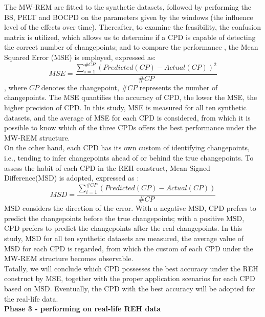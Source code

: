 \documentclass[]{interact}
\theoremstyle{plain}%
\theoremstyle{definition}
\theoremstyle{remark}
\begin{document}
{	The MW-REM are fitted to the synthetic datasets, followed by performing the BS, PELT and BOCPD on the parameters given by the windows (the influence level of the effects over time). Thereafter, to examine the feasibility, the confusion matrix is utilized, which allows us to determine if a CPD is capable of detecting the correct number of changepoints; and to compare the performance \cite{aminikhanghahiSurveyMethodsTime2017}, the Mean Squared Error (MSE) is employed,  expressed as:
	\begin{equation} \label{11}
		MSE = \frac{\sum_{i = 1}^{\#CP} (Predicted(CP) - Actual(CP))^2}{\#CP}
	\end{equation}
	, where $CP$ denotes the changepoint, $\#CP$ represents the number of changepoints. The MSE quantifies the accuracy of CPD, the lower the MSE, the higher precision of CPD. In this study, MSE is measured for all ten synthetic datasets, and the average of MSE for each CPD is considered, from which it is possible to know which of the three CPDs offers the best performance under the MW-REM structure. \\
	
	On the other hand, each CPD has its own custom of identifying changepoints, i.e., tending to infer changepoints ahead of or behind the true changepoints. To assess the habit of each CPD in the REH construct, Mean Signed Difference(MSD) is adopted, expressed as \cite{aminikhanghahiSurveyMethodsTime2017}:
	\begin{equation} \label{12}
		MSD = \frac{\sum_{i = 1}^{\#CP} (Predicted(CP) - Actual(CP))}{\#CP}
	\end{equation}
	MSD considers the direction of the error. With a negative MSD, CPD prefers to predict the changepoints before the true changepoints; with a positive MSD, CPD prefers to predict the changepoints after the real changepoints. In this study, MSD for all ten synthetic datasets are measured, the average value of MSD for each CPD is regarded, from which the custom of each CPD under the MW-REM structure becomes observable. \\
	
	Totally, we will conclude which CPD possesses the best accuracy under the REH construct by MSE, together with the proper application scenarios for each CPD based on MSD. Eventually, the CPD with the best accuracy will be adopted for the real-life data. \\
	
	\hspace{-0.55cm} \textbf{Phase 3 - performing on real-life REH data}\\
	
}
\end{document}
